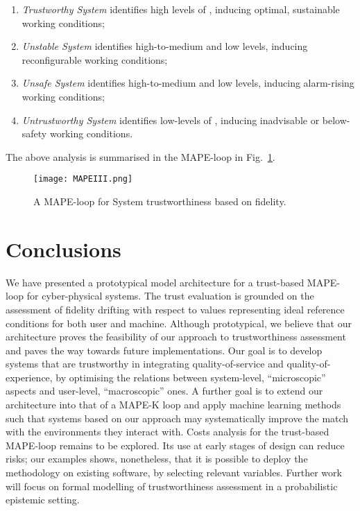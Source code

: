 \documentclass{article}
\begin{document}
\begin{enumerate}
\item \textit{Trustworthy System} identifies high levels of , inducing optimal, sustainable working conditions;
\item \textit{Unstable System} identifies high-to-medium  and low  levels, inducing reconfigurable working conditions;
\item \textit{Unsafe System} identifies high-to-medium  and low  levels, inducing alarm-rising working conditions;
\item \textit{Untrustworthy System} identifies low-levels of , inducing inadvisable or below-safety working conditions.
\end{enumerate}
The above analysis is summarised in the MAPE-loop in Fig.~\ref{fig6}.

\begin{figure}
\centerline{\texttt{[image: MAPEIII.png]}}
\caption{A MAPE-loop for System trustworthiness based on fidelity.}
\label{fig6}
\end{figure}



\section{Conclusions}\label{s:end}


We have presented a prototypical model architecture for a trust-based MAPE-loop for cyber-physical systems. The trust evaluation is grounded on the assessment of fidelity drifting with respect to values representing
ideal reference conditions for both user and machine.
Although prototypical, we believe that our architecture proves the feasibility of our approach to trustworthiness assessment
and paves the way towards future implementations.
Our goal is to develop systems that are trustworthy in integrating quality-of-service and quality-of-experience, by optimising the  relations between system-level, ``microscopic'' aspects and user-level, ``macroscopic'' ones.
A further goal is to extend our architecture into that of a MAPE-K loop and apply machine learning methods
such that systems based on our approach may systematically improve the match with the environments
they interact with.
Costs analysis for the trust-based MAPE-loop remains to be explored. Its use at early stages of design can reduce risks; our examples shows, nonetheless, that it is possible to deploy the methodology on existing software, by selecting relevant variables. Further work will focus on formal modelling of  trustworthiness assessment in a probabilistic epistemic setting.

















\end{document}
